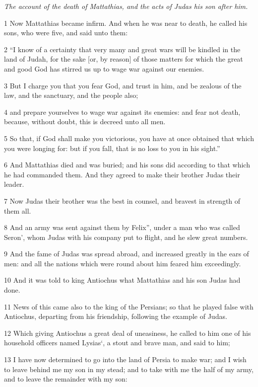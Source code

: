 \par \textit{The account of the death of Mattathias, and the acts of Judas his son after him.}

1 Now Mattathias became infirm. And when he was near to death, he called his sons, who were five, and said unto them: 

2 “I know of a certainty that very many and great wars will be kindled in the land of Judah, for the sake [or, by reason] of those matters for which the great and good God has stirred us up to wage war against our enemies. 

3 But I charge you that you fear God, and trust in him, and be zealous of the law, and the sanctuary, and the people also; 

4 and prepare yourselves to wage war against its enemies: and fear not death, because, without doubt, this is decreed unto all men. 

5 So that, if God shall make you victorious, you have at once obtained that which you were longing for: but if you fall, that is no loss to you in his sight.” 

6 And Mattathias died and was buried; and his sons did according to that which he had commanded them. And they agreed to make their brother Judas their leader. 

7 Now Judas their brother was the best in counsel, and bravest in strength of them all. 

8 And an army was sent against them by Felix”, under a man who was called Seron’, whom Judas with his company put to flight, and he slew great numbers. 

9 And the fame of Judas was spread abroad, and increased greatly in the ears of men: and all the nations which were round about him feared him exceedingly. 

10 And it was told to king Antiochus what Mattathias and his son Judas had done. 

11 News of this came also to the king of the Persians; so that he played false with Antiochus, departing from his friendship, following the example of Judas. 

12 Which giving Antiochus a great deal of uneasiness, he called to him one of his household officers named Lysias‘, a stout and brave man, and said to him; 

13 I have now determined to go into the land of Persia to make war; and I wish to leave behind me my son in my stead; and to take with me the half of my army, and to leave the remainder with my son: 

